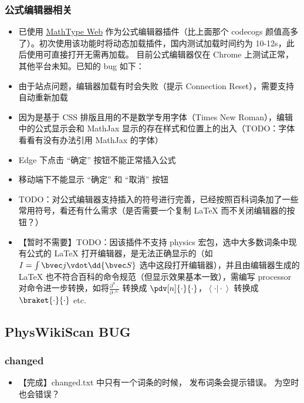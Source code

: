 \subsubsection{公式编辑器相关}
\begin{itemize}
\item 已使用 \href{http://www.wiris.net/client/editor/resources/help.html?v=7.9.0.6564}{MathType Web} 作为公式编辑器插件（比上面那个 codecogs 颜值高多了）。初次使用该功能时将动态加载插件，国内测试加载时间约为 10-12s，此后使用可直接打开无需再加载。
目前公式编辑器仅在 Chrome 上测试正常，其他平台未知。已知的 bug 如下：

\item 由于站点问题，编辑器加载有时会失败（提示 Connection Reset），需要支持自动重新加载

\item 因为是基于 CSS 排版且用的不是数学专用字体（Times New Roman），编辑中的公式显示会和 MathJax 显示的存在样式和位置上的出入（TODO：字体看看有没有办法引用 MathJax 的字体）

\item Edge 下点击 “确定” 按钮不能正常插入公式

\item 移动端下不能显示 “确定” 和 “取消” 按钮

\item TODO：对公式编辑器支持插入的符号进行完善，已经按照百科词条加了一些常用符号，看还有什么需求（是否需要一个复制 LaTeX 而不关闭编辑器的按钮？）

\item 【暂时不需要】TODO：因该插件不支持 physics 宏包，选中大多数词条中现有公式的 LaTeX 打开编辑器，是无法正确显示的（如 $I = \int\bvec j \vdot \dd{\bvec S}$ 选中这段打开编辑器），并且由编辑器生成的 LaTeX 也不符合百科的命令规范（但显示效果基本一致），需编写 processor 对命令进一步转换，如将$\frac{\partial^{n}{\cdot}}{\partial{\cdot}^{n}}$ 转换成 $\pdv[n]{\cdot}{\cdot}$，$\left\langle{\cdot}\vert{\cdot}\right\rangle$ 转换成 $\braket{\cdot}{\cdot}$ etc.
\end{itemize}

\subsection{PhysWikiScan BUG}

\subsubsection{changed}
\begin{itemize}
\item 【完成】changed.txt 中只有一个词条的时候， 发布词条会提示错误。 为空时也会错误？
\end{itemize}

